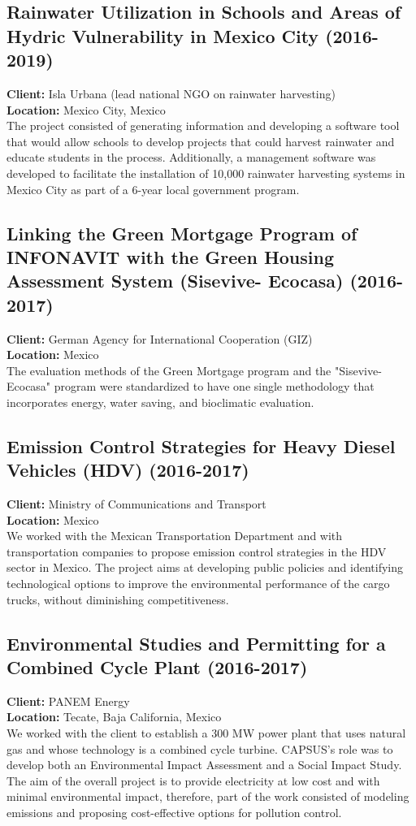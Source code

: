 \documentclass[
	a4paper,
	12pt,
	unnumberedsections,
]{CSSullivanBusinessReport}
\begin{document}
\subsection{Rainwater Utilization in Schools and Areas of Hydric Vulnerability in Mexico City (2016-2019)}
\textbf{Client:}  Isla Urbana (lead national NGO on rainwater harvesting) \\
\textbf{Location:}  Mexico City, Mexico	 \\[0.5em]
 The project consisted of generating information and developing a software tool that would allow schools to develop projects that could harvest rainwater and educate students in the process. Additionally, a management software was developed to facilitate the installation of 10,000 rainwater harvesting systems in Mexico City as part of a 6-year local government program.

\subsection{Linking the Green Mortgage Program of INFONAVIT with the Green Housing Assessment System (Sisevive- Ecocasa) (2016-2017)}
\textbf{Client:}  German Agency for International Cooperation (GIZ) \\
\textbf{Location:}  Mexico \\[0.5em]
 The evaluation methods of the Green Mortgage program and the "Sisevive-Ecocasa" program were standardized to have one single methodology that incorporates energy, water saving, and bioclimatic evaluation.

\subsection{Emission Control Strategies for Heavy Diesel Vehicles (HDV) (2016-2017)}
\textbf{Client:}  Ministry of Communications and Transport \\
\textbf{Location:}  Mexico \\[0.5em]
 We worked with the Mexican Transportation Department and with transportation companies to propose emission control strategies in the HDV sector in Mexico. The project aims at developing public policies and identifying technological options to improve the environmental performance of the cargo trucks, without diminishing competitiveness.

\subsection{Environmental Studies and Permitting for a Combined Cycle Plant (2016-2017)}
\textbf{Client:}  PANEM Energy \\
\textbf{Location:}  Tecate, Baja California, Mexico \\[0.5em]
 We worked with the client to establish a 300 MW power plant that uses natural gas and whose technology is a combined cycle turbine. CAPSUS's role was to develop both an Environmental Impact Assessment and a Social Impact Study. The aim of the overall project is to provide electricity at low cost and with minimal environmental impact, therefore, part of the work consisted of modeling emissions and proposing cost-effective options for pollution control.
\end{document}
